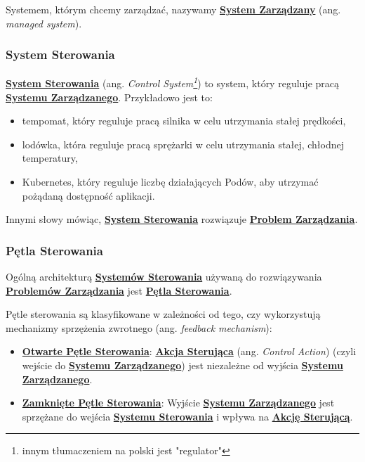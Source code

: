 Systemem, którym chcemy zarządzać, nazywamy \hyperlink{def:system-zarzadzany}{\textbf{System Zarządzany}} (ang. \textit{managed system}).

\subsubsection{System Sterowania}

\hyperlink{def:system-sterowania}{\textbf{System Sterowania}} (ang. \textit{Control System\footnote{innym tłumaczeniem na polski jest "regulator"}}) to system, który reguluje pracą \hyperlink{def:system-zarzadzany}{\textbf{Systemu Zarządzanego}}. Przykładowo jest to:
\begin{itemize}
    \item tempomat, który reguluje pracą silnika w celu utrzymania stałej prędkości,
    \item lodówka, która reguluje pracą sprężarki w celu utrzymania stałej, chłodnej temperatury,
    \item Kubernetes, który reguluje liczbę działających Podów, aby utrzymać pożądaną dostępność aplikacji.
\end{itemize}

Innymi słowy mówiąc, \hyperlink{def:system-sterowania}{\textbf{System Sterowania}} rozwiązuje \hyperlink{def:problem-zarzadzania}{\textbf{Problem Zarządzania}}.

\subsubsection{Pętla Sterowania}

Ogólną architekturą \hyperlink{def:system-sterowania}{\textbf{Systemów Sterowania}} używaną do rozwiązywania \hyperlink{def:problem-zarzadzania}{\textbf{Problemów Zarządzania}} jest \hyperlink{def:petla-sterowania}{\textbf{Pętla Sterowania}}.

Pętle sterowania są klasyfikowane w zależności od tego, czy wykorzystują mechanizmy sprzężenia zwrotnego (ang. \textit{feedback mechanism}):
\begin{itemize}
    \item \hyperlink{def:petla-sterowania}{\textbf{Otwarte Pętle Sterowania}}: \hyperlink{def:akcja-sterujaca}{\textbf{Akcja Sterująca}} (ang. \textit{Control Action}) (czyli wejście do \hyperlink{def:system-zarzadzany}{\textbf{Systemu Zarządzanego}}) jest niezależne od wyjścia \hyperlink{def:system-zarzadzany}{\textbf{Systemu Zarządzanego}}.
    \item \hyperlink{def:zamknieta-petla-sterowania}{\textbf{Zamknięte Pętle Sterowania}}: Wyjście \hyperlink{def:system-zarzadzany}{\textbf{Systemu Zarządzanego}} jest sprzężane do wejścia \hyperlink{def:system-sterowania}{\textbf{Systemu Sterowania}} i wpływa na \hyperlink{def:akcja-sterujaca}{\textbf{Akcję Sterującą}}. 
\end{itemize}

